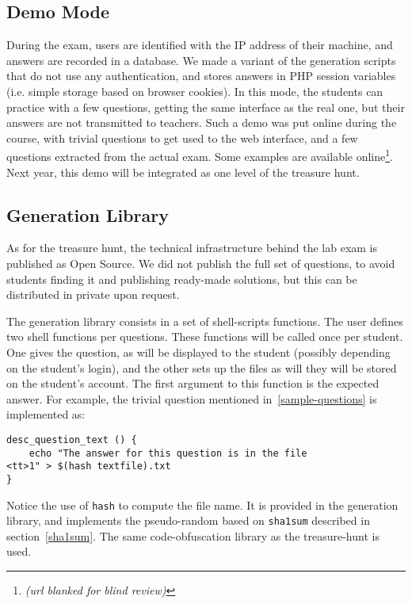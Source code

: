 \documentclass{sig-alternate}
\newcommand{\demosurl}[0]{\textit{(url blanked for blind review)}}
\newcommand{\demosurl}[0]{\url{http://www-verimag.imag.fr/~moy/demos-unix-training/}}
\begin{document}
\subsection{Demo Mode}

During the exam, users are identified with the IP address of their
machine, and answers are recorded in a database. We made a variant of
the generation scripts that do not use any authentication, and stores
answers in PHP session variables (i.e. simple storage based on browser
cookies). In this mode, the students can practice with a few
questions, getting the same interface as the real one, but their
answers are not transmitted to teachers. Such a demo was put online
during the course, with trivial questions to get used to the web
interface, and a few questions extracted from the actual exam. Some
examples are available online\footnote{\demosurl}.
Next year, this demo will be integrated as one level of the treasure
hunt.

\subsection{Generation Library}

As for the treasure hunt, the technical infrastructure behind the
lab exam is published as Open Source. We did not publish the full
set of questions, to avoid students finding it and publishing
ready-made solutions, but this can be distributed in private upon
request.

The generation library consists in a set of shell-scripts functions.
The user defines two shell functions per questions. These functions
will be called once per student. One gives the question, as will be
displayed to the student (possibly depending on the student's login),
and the other sets up the files as will they will be stored on the
student's account. The first argument to this function is the expected
answer. For example, the trivial question mentioned
in~\ref{sample-questions} is implemented as:

{\small
\begin{verbatim}
desc_question_text () {
    echo "The answer for this question is in the file
<tt>1" > $(hash textfile).txt
}
\end{verbatim}
}
Notice the use of \texttt{hash} to compute the file name. It is
provided in the generation library, and implements the pseudo-random
based on \texttt{sha1sum} described in section~\ref{sha1sum}.
The same code-obfuscation library as the treasure-hunt is used.
\end{document}
